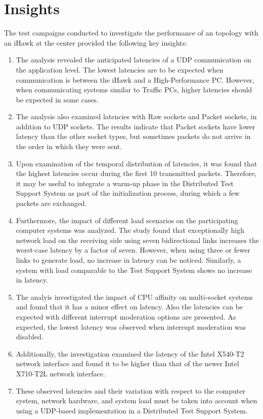 \clearpage
\section{Insights} \label{insight:perf}
The test campaigns conducted to investigate the performance of an topology with an iHawk at the center provided the following key insights:

\begin{enumerate}[label=(\roman*),resume]
    \item The analysis revealed the anticipated latencies of a UDP communication on the application level. The lowest latencies are to be expected when communication is between the iHawk and a High-Performance PC. However, when communicating systems similar to Traffic PCs, higher latencies should be expected in some cases. \label{insight:perf:1}
    \item The analysis also examined latencies with Raw sockets and Packet sockets, in addition to UDP sockets. The results indicate that Packet sockets have lower latency than the other socket types, but sometimes packets do not arrive in the order in which they were sent. \label{insight:perf:2}
    \item Upon examination of the temporal distribution of latencies, it was found that the highest latencies occur during the first 10 transmitted packets. Therefore, it may be useful to integrate a warm-up phase in the Distributed Test Support System as part of the initialization process, during which a few packets are exchanged.
    \item Furthermore, the impact of different load scenarios on the participating computer systems was analyzed. The study found that exceptionally high network load on the receiving side using seven bidirectional links increases the worst-case latency by a factor of seven. However, when using three or fewer links to generate load, no increase in latency can be noticed. Similarly, a system with load comparable to the Test Support System shows no increase in latency. \label{insight:perf:3}
    \item The analyis investigated the impact of CPU affinity on multi-socket systems and found that it has a minor effect on latency. Also the latencies can be expected with different interrupt moderation options are presented. As expected, the lowest latency was observed when interrupt moderation was disabled. \label{insight:perf:4}
    \item Additionally, the investigation examined the latency of the Intel X540-T2 network interface and found it to be higher than that of the newer Intel X710-T2L network interface. \label{insight:perf:5}
    \item These observed latencies and their variation with respect to the computer system, network hardware, and system load must be taken into account when using a UDP-based implementation in a Distributed Test Support System. \label{insight:perf:6}
\end{enumerate}


 



